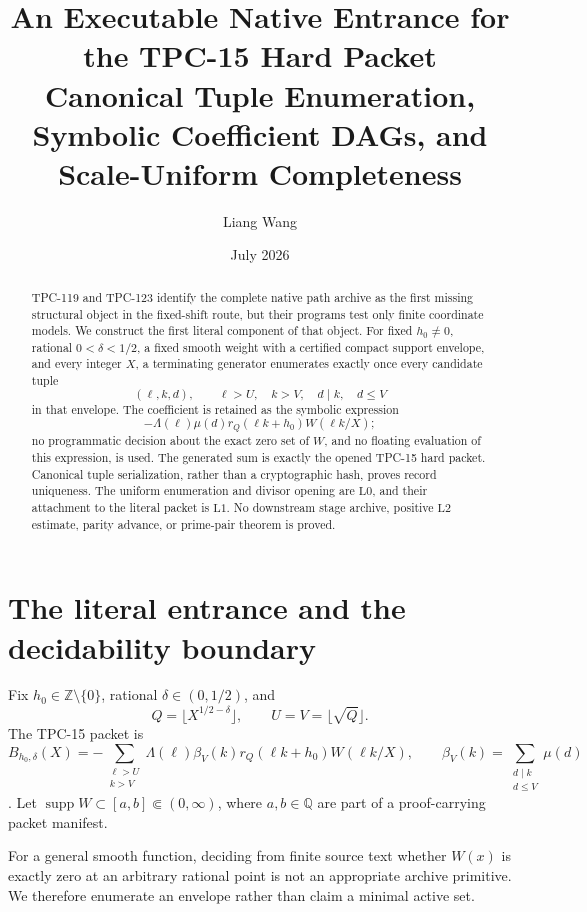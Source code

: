 \documentclass[11pt]{article}
\title{\textbf{An Executable Native Entrance for the TPC-15 Hard Packet}\\
\large Canonical Tuple Enumeration, Symbolic Coefficient DAGs, and
Scale-Uniform Completeness}
\author{Liang Wang}
\date{July 2026}
\theoremstyle{definition}
\theoremstyle{remark}
\newcommand{\Lzero}{\mathrm{L0}}
\newcommand{\Lone}{\mathrm{L1}}
\newcommand{\Ltwo}{\mathrm{L2}}
\begin{document}
\maketitle

\begin{abstract}
TPC-119 and TPC-123 identify the complete native path archive as the
first missing structural object in the fixed-shift route, but their
programs test only finite coordinate models.  We construct the first
literal component of that object.  For fixed \(h_0\ne0\), rational
\(0<\delta<1/2\), a fixed smooth weight with a certified compact
support envelope, and every integer \(X\), a terminating generator
enumerates exactly once every candidate tuple
\[
 (\ell,k,d),\qquad
 \ell>U,\quad k>V,\quad d\mid k,\quad d\le V
\]
in that envelope.  The coefficient is retained as the symbolic
expression
\[
 -\Lambda(\ell)\mu(d)r_Q(\ell k+h_0)W(\ell k/X);
\]
no programmatic decision about the exact zero set of \(W\), and no
floating evaluation of this expression, is used.  The generated sum
is exactly the opened TPC-15 hard packet.  Canonical tuple
serialization, rather than a cryptographic hash, proves record
uniqueness.  The uniform enumeration and divisor opening are
\(\Lzero\), and their attachment to the literal packet is \(\Lone\).
No downstream stage archive, positive \(\Ltwo\) estimate, parity
advance, or prime-pair theorem is proved.
\end{abstract}

\section{The literal entrance and the decidability boundary}

Fix \(h_0\in\mathbb Z\setminus\{0\}\), rational
\(\delta\in(0,1/2)\), and
\[
 Q=\lfloor X^{1/2-\delta}\rfloor,\qquad
 U=V=\lfloor\sqrt Q\rfloor.
\]
The TPC-15 packet is
\begin{equation}
 B_{h_0,\delta}(X)=
 -\sum_{\substack{\ell>U\\k>V}}
 \Lambda(\ell)\beta_V(k)r_Q(\ell k+h_0)W(\ell k/X),
 \qquad
 \beta_V(k)=\sum_{\substack{d\mid k\\d\le V}}\mu(d)
 \label{eq:packet}
\end{equation}
\citep{WangTPC15,WangTPC119}.  Let
\(\operatorname{supp}W\subset[a,b]\Subset(0,\infty)\), where
\(a,b\in\mathbb Q\) are part of a proof-carrying packet manifest.

For a general smooth function, deciding from finite source text
whether \(W(x)\) is exactly zero at an arbitrary rational point is not
an appropriate archive primitive.  We therefore enumerate an
envelope rather than claim a minimal active set.
\end{document}
